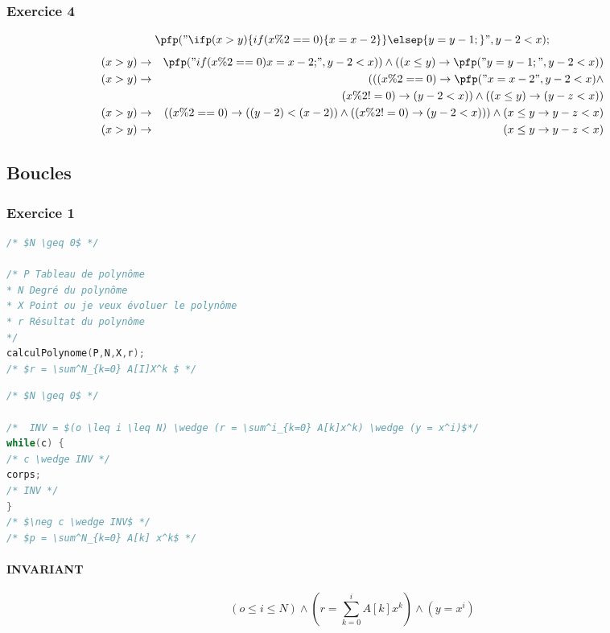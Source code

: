 \subsubsection{Exercice 4}
$$\pfp ("\ifp (x > y) \{ if(x \%2 ==  0) \{ x = x - 2\}\} \elsep \{y=y-1;\}", y-2 < x);$$
\begin{eqnarray*}
(x > y) &\rightarrow& \pfp("if(x\%2 == 0) { x = x-2; } ", y-2 < x)) \wedge ( ( x \leq y) \rightarrow \pfp ("y = y-1;", y - 2 < x) )\\
(x > y) &\rightarrow& ( ( (x \%2 = =0) \rightarrow \pfp ("x = x-2", y-2 < x) \wedge \\
& &(x \% 2 != 0) \rightarrow(y-2 < x)) \wedge ( (x \leq y) \rightarrow (y-z < x))\\ 
(x > y) &\rightarrow& ( (x\%2 = = 0)\rightarrow ( (y-2) < (x - 2) ) \wedge ( ( x\%2 != 0) \rightarrow (y-2 < x))) \wedge (x \leq y \rightarrow y-z < x) \\
(x > y) &\rightarrow& (x \leq y \rightarrow y - z < x)
\end{eqnarray*}
\subsection{Boucles}\label{exoPfpBoucles}
\subsubsection{Exercice 1}
\begin{lstlisting}[language=C]
/* $N \geq 0$ */

/* P Tableau de polynôme
* N Degré du polynôme
* X Point ou je veux évoluer le polynôme
* r Résultat du polynôme
*/
calculPolynome(P,N,X,r);
/* $r = \sum^N_{k=0} A[I]X^k $ */
\end{lstlisting}
\begin{lstlisting}[language=C]
/* $N \geq 0$ */

/*	INV = $(o \leq i \leq N) \wedge (r = \sum^i_{k=0} A[k]x^k) \wedge (y = x^i)$*/
while(c) {
/* c \wedge INV */
corps;
/* INV */
}
/* $\neg c \wedge INV$ */
/* $p = \sum^N_{k=0} A[k] x^k$ */
\end{lstlisting}
\paragraph{INVARIANT}
$$(o \leq i \leq N) \wedge (r = \sum^i_{k=0} A[k]x^k) \wedge (y = x^i)$$
